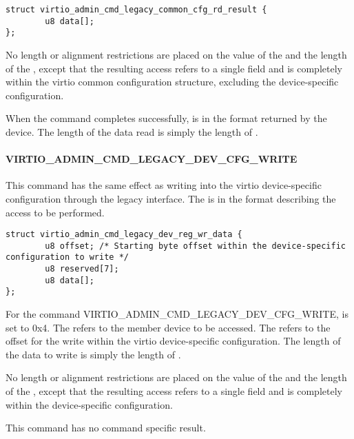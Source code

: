 \begin{lstlisting}
struct virtio_admin_cmd_legacy_common_cfg_rd_result {
        u8 data[];
};
\end{lstlisting}

No length or alignment restrictions are placed on the value of the
 and the length of the , except that the resulting
access refers to a single field and is completely within the virtio common
configuration structure, excluding the device-specific configuration.

When the command completes successfully, 
is in the format 
returned by the device. The length of the data read is simply the length of
.

\paragraph{VIRTIO_ADMIN_CMD_LEGACY_DEV_CFG_WRITE}
\label{par:Basic Facilities of a Virtio Device / Device groups / Group administration commands / Legacy Interface / VIRTIO_ADMIN_CMD_LEGACY_DEV_CFG_WRITE}

This command has the same effect as writing into the virtio device-specific
configuration through the legacy interface. The  is in
the format  describing
the access to be performed.

\begin{lstlisting}
struct virtio_admin_cmd_legacy_dev_reg_wr_data {
        u8 offset; /* Starting byte offset within the device-specific configuration to write */
        u8 reserved[7];
        u8 data[];
};
\end{lstlisting}

For the command VIRTIO_ADMIN_CMD_LEGACY_DEV_CFG_WRITE, 
is set to 0x4.
The  refers to the member device to be accessed.
The  refers to the offset for the write within the virtio
device-specific configuration. The length of the data to write is simply
the length of .

No length or alignment restrictions are placed on the value of the
 and the length of the , except that the resulting
access refers to a single field and is completely within the device-specific
configuration.

This command has no command specific result.

